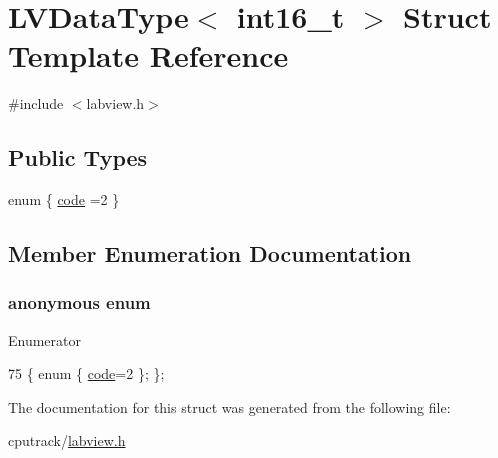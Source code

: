 \hypertarget{struct_l_v_data_type_3_01int16__t_01_4}{}\section{L\+V\+Data\+Type$<$ int16\+\_\+t $>$ Struct Template Reference}
\label{struct_l_v_data_type_3_01int16__t_01_4}


{\ttfamily \#include $<$labview.\+h$>$}

\subsection*{Public Types}
\begin{DoxyCompactItemize}
\item 
enum \{ \hyperlink{struct_l_v_data_type_3_01int16__t_01_4_a3dfd768ff636d8d5396f7214f0e8f793a87f67ebbee61d1e22deef1db89f5fd47}{code} =2
 \}
\end{DoxyCompactItemize}


\subsection{Member Enumeration Documentation}
\subsubsection[{\texorpdfstring{anonymous enum}{anonymous enum}}]{\setlength{\rightskip}{0pt plus 5cm}anonymous enum}\hypertarget{struct_l_v_data_type_3_01int16__t_01_4_a3dfd768ff636d8d5396f7214f0e8f793}{}\label{struct_l_v_data_type_3_01int16__t_01_4_a3dfd768ff636d8d5396f7214f0e8f793}
\begin{Desc}
\item[Enumerator]\par
\begin{description}
\item[{\em 
code\hypertarget{struct_l_v_data_type_3_01int16__t_01_4_a3dfd768ff636d8d5396f7214f0e8f793a87f67ebbee61d1e22deef1db89f5fd47}{}\label{struct_l_v_data_type_3_01int16__t_01_4_a3dfd768ff636d8d5396f7214f0e8f793a87f67ebbee61d1e22deef1db89f5fd47}
}]\end{description}
\end{Desc}

\begin{DoxyCode}
75 \{ \textcolor{keyword}{enum} \{ \hyperlink{struct_l_v_data_type_3_01int16__t_01_4_a3dfd768ff636d8d5396f7214f0e8f793a87f67ebbee61d1e22deef1db89f5fd47}{code}=2 \}; \};
\end{DoxyCode}


The documentation for this struct was generated from the following file\+:\begin{DoxyCompactItemize}
\item 
cputrack/\hyperlink{labview_8h}{labview.\+h}\end{DoxyCompactItemize}
